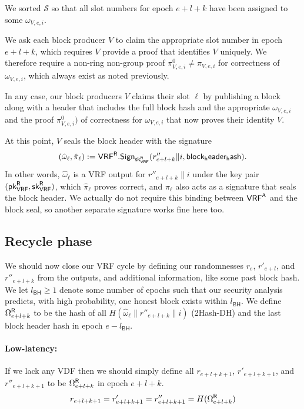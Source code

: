 We sorted $\mathcal{S}$ so that all slot numbers for epoch $e+l+k$ have been assigned to some $\omega_{V,e,i}$.  

We ask each block producer $V$ to claim the appropriate slot number in epoch $e+l+k$, which requires $V$ provide a proof that identifies $V$ uniquely.  
We therefore require a non-ring non-group proof $\pi^0_{V,e,i} \ne \pi_{V,e,i}$ for correctness of $\omega_{V,e,i}$, which always exist as noted previously.

In any case, our block producers $V$ claims their slot $\ell$ by publishing a block along with a header that includes the full block hash and the appropriate $\omega_{V,e,i}$ and the proof $\pi^0_{V,e,i})$ of correctness for $\omega_{V,e,i}$ that now proves their identity $V$.  

At this point, $V$ seals the block header with the signature
$$ (\hat{\omega}_{\ell},\hat{\pi}_{\ell}) := \mathsf{VRF}^{\mathsf{R}}.\mathsf{Sign}_{\mathsf{sk}_{\mathsf{VRF}}^{\mathsf{R}}}(r''_{e+l+k} \| i, \mathsf{block_header_hash}) . $$
In other words, $\hat{\omega}_{\ell}$ is a VRF output for $r''_{e+l+k} \| i$ under the key pair $(\mathsf{pk}_{\mathsf{VRF}}^{\mathsf{R}},\mathsf{sk}_{\mathsf{VRF}}^{\mathsf{R}})$, which $\hat{\pi}_{\ell}$ proves correct, and $\hat{\pi}_{\ell}$ also acts as a signature that seals the block header.  We actually do not require this binding between $\mathsf{VRF}^{\mathsf{A}}$ and the block seal, so another separate signature works fine here too.


\subsection{Recycle phase}\label{subsec:recycle_phase}
\newcommand\id{\mathsf{id}}
\newcommand{\epochsdelayforblockhash}{l_{\mathsf{BH}}}
\newcommand{\epochsdelayforVDF}{l_{\mathsf{VDF}}}

We should now close our VRF cycle by defining our randomnesses $r_e$, $r'_{e+l}$, and $r''_{e+l+k}$ from the \VRFr outputs, and additional information, like some past block hash.  We let $\epochsdelayforblockhash \ge 1$ denote some number of epochs such that our security analysis predicts, with high probability, one honest block exists within $\epochsdelayforblockhash$.  We define $\Omega^{\mathsf{R}}_{e+l+k}$ to be the hash of all $H(\hat{\omega}_{\ell} \| r''_{e+l+k} \| i)$ (2Hash-DH) and the last block header hash in epoch $e - \epochsdelayforblockhash$.

\paragraph{Low-latency:} 
If we lack any VDF then we should simply define all $r_{e+l+k+1}$, $r'_{e+l+k+1}$, and $r''_{e+l+k+1}$ to be $\Omega^{\mathsf{R}}_{e+l+k}$ in epoch $e+l+k$.
$$
r_{e+l+k+1} = r'_{e+l+k+1} = r''_{e+l+k+1} = H(\Omega^{\mathsf{R}}_{e+l+k})
$$


